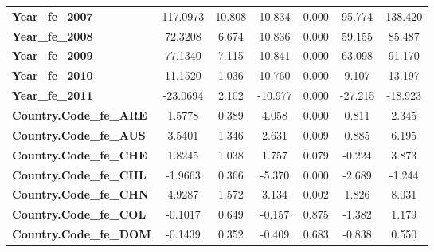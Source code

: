 \begin{center}
\begin{tabular}{lcccccc}
\textbf{Year\_fe\_2007}                                            &     117.0973  &       10.808     &    10.834  &         0.000        &       95.774    &      138.420     \\
\textbf{Year\_fe\_2008}                                            &      72.3208  &        6.674     &    10.836  &         0.000        &       59.155    &       85.487     \\
\textbf{Year\_fe\_2009}                                            &      77.1340  &        7.115     &    10.841  &         0.000        &       63.098    &       91.170     \\
\textbf{Year\_fe\_2010}                                            &      11.1520  &        1.036     &    10.760  &         0.000        &        9.107    &       13.197     \\
\textbf{Year\_fe\_2011}                                            &     -23.0694  &        2.102     &   -10.977  &         0.000        &      -27.215    &      -18.923     \\
\textbf{Country.Code\_fe\_ARE}                                     &       1.5778  &        0.389     &     4.058  &         0.000        &        0.811    &        2.345     \\
\textbf{Country.Code\_fe\_AUS}                                     &       3.5401  &        1.346     &     2.631  &         0.009        &        0.885    &        6.195     \\
\textbf{Country.Code\_fe\_CHE}                                     &       1.8245  &        1.038     &     1.757  &         0.079        &       -0.224    &        3.873     \\
\textbf{Country.Code\_fe\_CHL}                                     &      -1.9663  &        0.366     &    -5.370  &         0.000        &       -2.689    &       -1.244     \\
\textbf{Country.Code\_fe\_CHN}                                     &       4.9287  &        1.572     &     3.134  &         0.002        &        1.826    &        8.031     \\
\textbf{Country.Code\_fe\_COL}                                     &      -0.1017  &        0.649     &    -0.157  &         0.875        &       -1.382    &        1.179     \\
\textbf{Country.Code\_fe\_DOM}                                     &      -0.1439  &        0.352     &    -0.409  &         0.683        &       -0.838    &        0.550     \\

\end{tabular}
\end{center}
